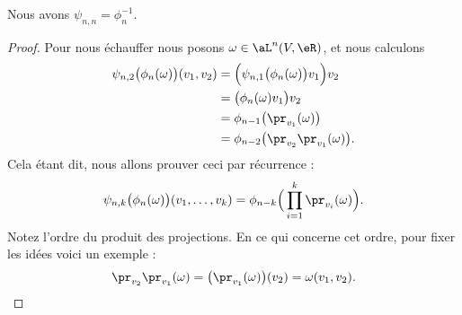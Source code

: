 \begin{lemma}       \label{LEMooFBEGooCqrzxH}
    Nous avons \( \psi_{n,n}=\phi_n^{-1}\).
\end{lemma}

\begin{proof}
    Pour nous échauffer nous posons \( \omega\in\aL^n(V,\eR)\), et nous calculons
    \begin{subequations}        \label{EQooPBQIooUValDA}
        \begin{align}
            \psi_{n,2}\big( \phi_n(\omega) \big)(v_1,v_2)&=\Big( \psi_{n,1}\big( \phi_n(\omega) \big)v_1 \Big)v_2\\
            &=\big( \phi_n(\omega)v_1 \big)v_2\\
            &=\phi_{n-1}\big( \pr_{v_1}(\omega) \big)\\
            &=\phi_{n-2}\big( \pr_{v_2}\pr_{v_1}(\omega) \big).
        \end{align}
    \end{subequations}
    Cela étant dit, nous allons prouver ceci par récurrence :
    \begin{equation}
        \psi_{n,k}\big( \phi_n(\omega) \big)(v_1,\ldots, v_k)=\phi_{n-k}\Big( \prod_{i=1}^k\pr_{v_i}(\omega) \Big).
    \end{equation}
    Notez l'ordre du produit des projections. En ce qui concerne cet ordre, pour fixer les idées voici un exemple :
    \begin{equation}
        \pr_{v_2}\pr_{v_1}(\omega)=\big( \pr_{v_1}(\omega) \big)(v_2)=\omega(v_1,v_2).
    \end{equation}
    

\end{proof}
